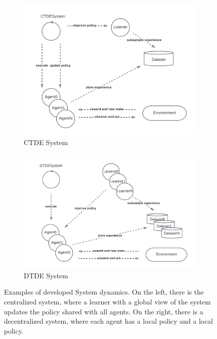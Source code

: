 \documentclass[12pt,a4paper,openright,twoside]{book}
\begin{document}
    \begin{figure}[t]
        \centering
        \begin{subfigure}[b]{0.49\textwidth}
            \centering
            \includegraphics[width=\textwidth]{figures/ctdesystem.pdf}
            \caption{CTDE System}
        \end{subfigure}
        \begin{subfigure}[b]{0.49\textwidth}
            \centering
            \includegraphics[width=\textwidth]{figures/DTDE.pdf}
            \caption{DTDE System}
        \end{subfigure}
    \caption{Examples of developed System dynamics. 
    On the left, there is the centralized system, 
    where a learner with a global view of the system 
    updates the policy shared with all agents. 
    On the right, there is a decentralized system, 
    where each agent has a local policy and a local policy.}
    \label{fig:systems}
    \end{figure}
\end{document}
